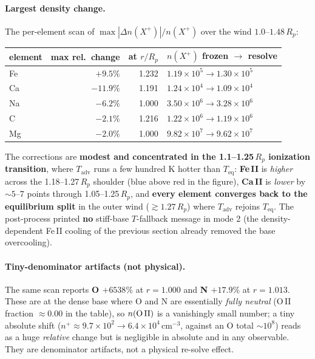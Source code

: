 \documentclass[english,a4paper]{kiseon_memo}
\begin{document}
\paragraph{Largest density change.} The per-element scan of
\(\max |\Delta n(X^+)| / n(X^+)\) over the wind \(1.0\)--\(1.48\,R_p\):

\begin{center}
\small
\begin{tabular}{lrrl}
\hline
element & max rel.\ change & at \(r/R_p\) & \(n(X^+)\) frozen \(\to\) resolve \\
\hline
Fe & \(+9.5\%\)  & 1.232 & \(1.19\!\times\!10^{5} \to 1.30\!\times\!10^{5}\) \\
Ca & \(-11.9\%\) & 1.191 & \(1.24\!\times\!10^{4} \to 1.09\!\times\!10^{4}\) \\
Na & \(-6.2\%\)  & 1.000 & \(3.50\!\times\!10^{6} \to 3.28\!\times\!10^{6}\) \\
C  & \(-2.1\%\)  & 1.216 & \(1.22\!\times\!10^{6} \to 1.19\!\times\!10^{6}\) \\
Mg & \(-2.0\%\)  & 1.000 & \(9.82\!\times\!10^{7} \to 9.62\!\times\!10^{7}\) \\
\hline
\end{tabular}
\end{center}

The corrections are \textbf{modest and concentrated in the 1.1--1.25\,\(R_p\)
ionization transition}, where \(T_{\mathrm{adv}}\) runs a few hundred K hotter
than \(T_{\mathrm{eq}}\): \textbf{Fe\,II} is \emph{higher} across the
1.18--1.27\,\(R_p\) shoulder (blue above red in the figure), \textbf{Ca\,II} is
\emph{lower} by \(\sim5\)--7 points through 1.05--1.25\,\(R_p\), and \textbf{every
element converges back to the equilibrium split} in the outer wind
(\(\gtrsim1.27\,R_p\)) where \(T_{\mathrm{adv}}\) rejoins \(T_{\mathrm{eq}}\). The
post-process printed \textbf{no} stiff-base \(T\)-fallback message in mode 2 (the
density-dependent Fe\,II cooling of the previous section already removed the base
overcooling).

\paragraph{Tiny-denominator artifacts (not physical).} The same scan reports
\textbf{O \(+6538\%\)} at \(r = 1.000\) and \textbf{N \(+17.9\%\)} at
\(r = 1.013\). These are at the dense base where O and N are essentially
\emph{fully neutral} (O\,II fraction \(\approx 0.00\) in the table), so
\(n(\text{O\,II})\) is a vanishingly small number; a tiny absolute shift
(\(n^+ \approx 9.7\!\times\!10^{2} \to 6.4\!\times\!10^{4}\,\mathrm{cm^{-3}}\),
against an O total \(\sim10^8\)) reads as a huge \emph{relative} change but is
negligible in absolute and in any observable. They are denominator artifacts, not
a physical re-solve effect.
\end{document}
